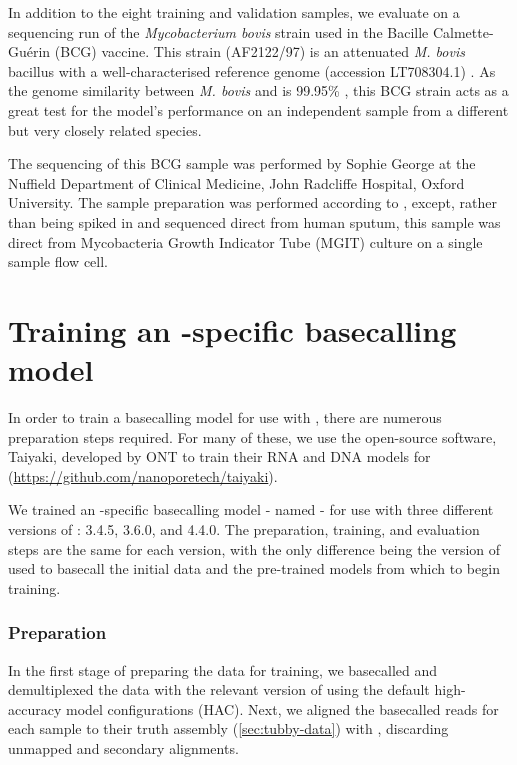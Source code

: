 In addition to the eight training and validation samples, we evaluate on a \ont{} sequencing run of the \textit{Mycobacterium bovis} strain used in the Bacille Calmette-Guérin (BCG) vaccine. This strain (AF2122/97) is an attenuated \textit{M. bovis} bacillus \cite{luca2013} with a well-characterised reference genome (accession LT708304.1) \cite{Malone2017}. As the genome similarity between \textit{M. bovis} and \mtb{} is 99.95\% \cite{Kanipe2020}, this BCG strain acts as a great test for the model's performance on an independent sample from a different but very closely related species.

The \ont{} sequencing of this BCG sample was performed by Sophie George at the Nuffield Department of Clinical Medicine, John Radcliffe Hospital, Oxford University. The sample preparation was performed according to \cite{George2020}, except, rather than being spiked in and sequenced direct from human sputum, this sample was direct from Mycobacteria Growth Indicator Tube (MGIT) culture on a single sample flow cell.

\section{Training an \mtb{}-specific \ont{} basecalling model}

In order to train a basecalling model for use with \guppy{}, there are numerous preparation steps required. For many of these, we use the open-source software, Taiyaki, developed by ONT to train their RNA and DNA models for \guppy{} (\url{https://github.com/nanoporetech/taiyaki}).

We trained an \mtb{}-specific basecalling model - named \tubby{} - for use with three different versions of \guppy{}: 3.4.5, 3.6.0, and 4.4.0. The preparation, training, and evaluation steps are the same for each version, with the only difference being the version of \guppy{} used to basecall the initial data and the pre-trained models from which to begin training.

\subsubsection{Preparation}

In the first stage of preparing the data for training, we basecalled and demultiplexed the data with the relevant version of \guppy{} using the default high-accuracy model configurations (HAC). Next, we aligned the basecalled reads for each sample to their truth assembly (\autoref{sec:tubby-data}) with  \cite{li2018}, discarding unmapped and secondary alignments.

